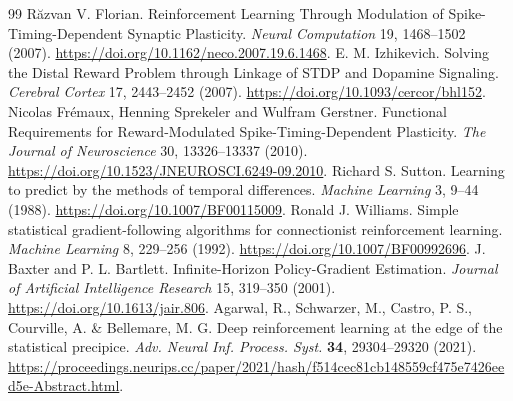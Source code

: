 \begin{thebibliography}{99}
 R\u{a}zvan V. Florian. Reinforcement Learning Through Modulation of Spike-Timing-Dependent Synaptic Plasticity. \emph{Neural Computation} 19, 1468--1502 (2007). \url{https://doi.org/10.1162/neco.2007.19.6.1468}.
 E. M. Izhikevich. Solving the Distal Reward Problem through Linkage of STDP and Dopamine Signaling. \emph{Cerebral Cortex} 17, 2443--2452 (2007). \url{https://doi.org/10.1093/cercor/bhl152}.
 Nicolas Fr\'{e}maux, Henning Sprekeler and Wulfram Gerstner. Functional Requirements for Reward-Modulated Spike-Timing-Dependent Plasticity. \emph{The Journal of Neuroscience} 30, 13326--13337 (2010). \url{https://doi.org/10.1523/JNEUROSCI.6249-09.2010}.
 Richard S. Sutton. Learning to predict by the methods of temporal differences. \emph{Machine Learning} 3, 9--44 (1988). \url{https://doi.org/10.1007/BF00115009}.
 Ronald J. Williams. Simple statistical gradient-following algorithms for connectionist reinforcement learning. \emph{Machine Learning} 8, 229--256 (1992). \url{https://doi.org/10.1007/BF00992696}.
 J. Baxter and P. L. Bartlett. Infinite-Horizon Policy-Gradient Estimation. \emph{Journal of Artificial Intelligence Research} 15, 319--350 (2001). \url{https://doi.org/10.1613/jair.806}.
 Agarwal, R., Schwarzer, M., Castro, P. S., Courville, A. \& Bellemare, M. G. Deep reinforcement learning at the edge of the statistical precipice. \emph{Adv. Neural Inf. Process. Syst.} \textbf{34}, 29304--29320 (2021). \url{https://proceedings.neurips.cc/paper/2021/hash/f514cec81cb148559cf475e7426eed5e-Abstract.html}.
\end{thebibliography}

